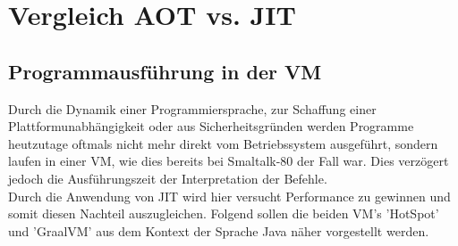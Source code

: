 \chapter{Vergleich AOT vs. JIT}

\section{Programmausführung in der VM} \label{jit_vm}
Durch die Dynamik einer Programmiersprache, zur Schaffung einer Plattformunabhängigkeit oder aus Sicherheitsgründen werden Programme heutzutage oftmals nicht mehr direkt vom Betriebssystem ausgeführt, sondern laufen in einer \ac{VM}, wie dies bereits bei Smaltalk-80 der Fall war. Dies verzögert jedoch die Ausführungszeit der Interpretation der Befehle. \\
Durch die Anwendung von \ac{JIT} wird hier versucht Performance zu gewinnen und somit diesen Nachteil auszugleichen. Folgend sollen die beiden \ac{VM}'s 'HotSpot' und 'GraalVM' aus dem Kontext der Sprache Java näher vorgestellt werden. 

